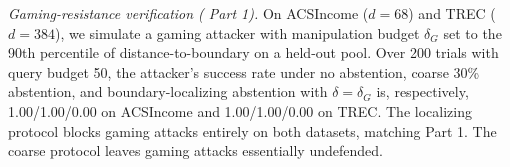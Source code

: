 \textit{Gaming-resistance verification ( Part 1).} On
ACSIncome ($d=68$) and TREC ($d=384$), we simulate a gaming attacker with
manipulation budget $\delta_G$ set to the 90th percentile of distance-to-boundary
on a held-out pool. Over 200 trials with query budget 50, the attacker's success
rate under no abstention, coarse 30\% abstention, and boundary-localizing
abstention with $\delta = \delta_G$ is, respectively, 1.00/1.00/0.00 on
ACSIncome and 1.00/1.00/0.00 on TREC. The localizing protocol blocks gaming
attacks entirely on both datasets, matching  Part 1.
The coarse protocol leaves gaming attacks essentially undefended.
